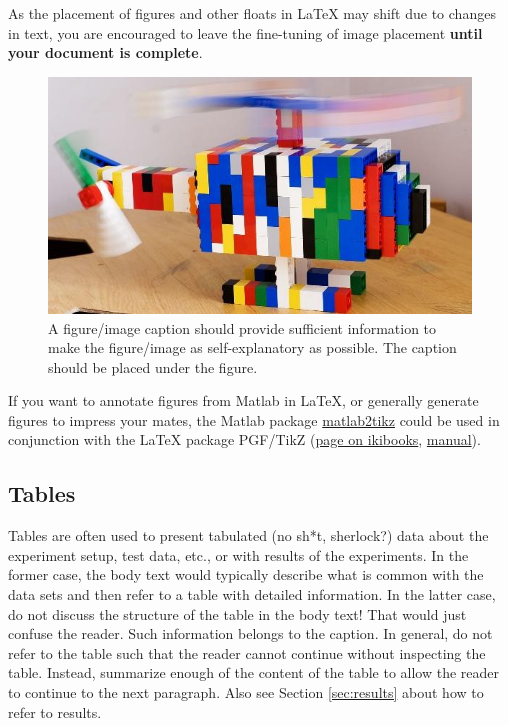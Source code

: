 \documentclass[10pt, titlepage, oneside, a4paper]{article}
\begin{document}
As the placement of figures and other floats in \LaTeX{} may shift due to
changes in text, you are encouraged to leave the fine-tuning of image
placement \textbf{until your document is complete}.

\begin{figure}[tbp]
\centering
\includegraphics[width=0.7\hsize]{./img.jpg}
\caption{\label{fig:image}A figure/image caption should provide sufficient information to make the figure/image as self-explanatory as possible. The caption should be placed under the figure.}
\end{figure}

If you want to annotate figures from Matlab in \LaTeX{}, or generally
generate figures to impress your mates, the Matlab package \href{https://se.mathworks.com/matlabcentral/fileexchange/22022-matlab2tikz-matlab2tikz?s\_tid=srchtitle}{matlab2tikz}
could be used in conjunction with the \LaTeX{} package PGF/TikZ (\href{https://en.wikibooks.org/wiki/LaTeX/PGF/TikZ}{page on
ikibooks}, \href{https://ctan.org/pkg/pgf}{manual}).

\subsection{Tables}
\label{app:tables}
Tables are often used to present tabulated (no sh*t, sherlock?) data
about the experiment setup, test data, etc., or with results of the
experiments. In the former case, the body text would typically
describe what is common with the data sets and then refer to a table
with detailed information. In the latter case, do not discuss the
structure of the table in the body text! That would just confuse the
reader. Such information belongs to the caption. In general, do not
refer to the table such that the reader cannot continue without
inspecting the table. Instead, summarize enough of the content of the
table to allow the reader to continue to the next paragraph. Also see
Section \ref{sec:results} about how to refer to results.
\end{document}
